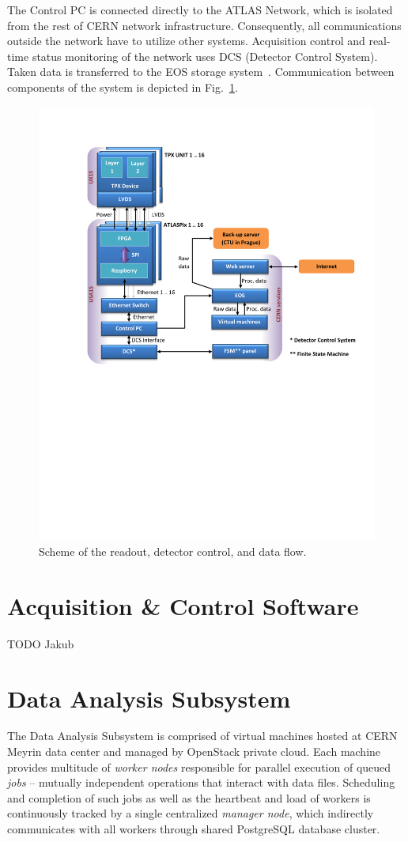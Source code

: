 \documentclass[journal]{IEEEtran}
\begin{document}
The Control PC is connected directly to the ATLAS Network, which is isolated from the rest of CERN network infrastructure. Consequently, all communications outside the network have to utilize other systems. Acquisition control and real-time status monitoring of the network uses DCS (Detector Control System). Taken data is transferred to the EOS storage system~\cite{MAscetti2015,Peters2011}. Communication between components of the system is depicted in Fig.~\ref{fig:data_flow}.

\begin{figure}[tbp]
	\centering
        \includegraphics[clip, trim={2cm 11.2cm 0cm 2.6cm}, width=.5\textwidth, angle = 0 ]{Plots/Doc1.pdf}
      \caption {Scheme of the readout, detector control, and data flow.}
    \label{fig:data_flow}
\end{figure}

\section{\label{sec:acquisition}Acquisition \& Control Software}
TODO Jakub

\section{\label{sec:analysis}Data Analysis Subsystem}
The Data Analysis Subsystem is comprised of virtual machines hosted at CERN Meyrin data center and managed by OpenStack private cloud. Each machine provides multitude of \textit{worker nodes} responsible for parallel execution of queued \textit{jobs} -- mutually independent operations that interact with data files. Scheduling and completion of such jobs as well as the heartbeat and load of workers is continuously tracked by a single centralized \textit{manager node}, which indirectly communicates with all workers through shared PostgreSQL database cluster.
\end{document}
